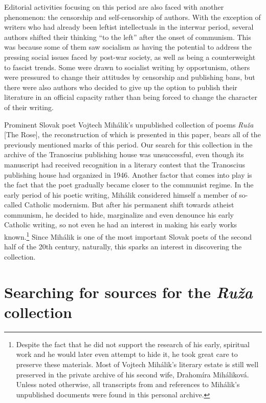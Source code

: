 \begin{paper}
Editorial activities focusing on this period are also faced with another
phenomenon: the censorship and self-censorship of authors. With the
exception of writers who had already been leftist intellectuals in the
interwar period, several authors shifted their thinking ``to the left''
after the onset of communism. This was because some of them saw
socialism as having the potential to address the pressing social issues
faced by post-war society, as well as being a counterweight to fascist
trends. Some were drawn to socialist writing by opportunism, others were
pressured to change their attitudes by censorship and publishing bans,
but there were also authors who decided to give up the option to publish
their literature in an official capacity rather than being forced to
change the character of their writing.

Prominent Slovak poet Vojtech Mihálik's unpublished collection of poems
\emph{Ruža} [The Rose], the reconstruction of which is presented in this paper,
bears all of the previously mentioned marks of this period. Our search
for this collection in the archive of the Tranoscius publishing house
was unsuccessful, even though its manuscript had received recognition in
a literary contest that the Tranoscius publishing house had organized in
1946. Another factor that comes into play is the fact that the poet
gradually became closer to the communist regime. In the early period of
his poetic writing, Mihálik considered himself a member of so-called
Catholic modernism. But after his permanent shift towards atheist
communism, he decided to hide, marginalize and even denounce his early
Catholic writing, so not even he had an interest in making his early
works known.\footnote{\label{foot:navratil1}Despite the fact that he did not support the
  research of his early, spiritual work and he would later even attempt
  to hide it, he took great care to preserve these materials. Most of
  Vojtech Mihálik's literary estate is still well preserved in the
  private archive of his second wife, Drahomíra Miháliková. Unless noted otherwise, all transcripts from and references to Mihálik's unpublished documents were found in this personal archive.} Since
Mihálik is one of the most important Slovak poets of the second half of
the 20th century, naturally, this sparks an interest in discovering the
collection.

\section{Searching for sources for the \emph{Ruža}
collection}


\end{paper}
